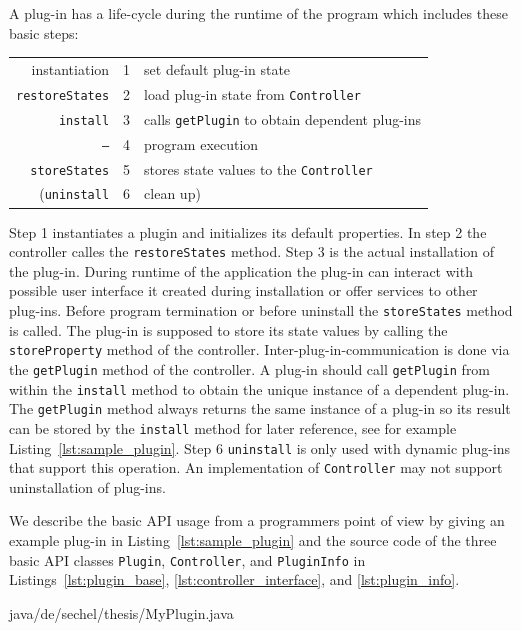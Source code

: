 \documentclass[Thesis.tex]{subfiles}
\begin{document}
A plug-in has a life-cycle during the runtime of the program which includes these basic
steps:
\begin{center}
\begin{tabular}{r|r|l}
	instantiation & 1 & set default plug-in state\\
	{\tt restoreStates} & 2 & load plug-in state from {\tt Controller}\\
	{\tt install} & 3 & calls {\tt getPlugin} to obtain dependent plug-ins\\
	{\tt --}  & 4 & program execution\\
	{\tt storeStates} & 5 & stores state values to the {\tt Controller}\\
	({\tt uninstall} & 6 & clean up)
\end{tabular}
\end{center}
Step 1 instantiates a plugin and initializes its default properties. In step 2 the controller 
calles the {\tt restoreStates} method. Step 3 is the actual installation of the plug-in. 
During runtime
of the application the plug-in can interact with possible user interface it created during 
installation or offer services to other plug-ins. 
Before program termination or before uninstall the {\tt storeStates} method is called. The plug-in
is supposed to store its state values by calling the {\tt storeProperty}
method of the controller.
Inter-plug-in-communication is done via the {\tt getPlugin} method of the controller. 
A plug-in should call {\tt getPlugin} from within the {\tt install} method to obtain the unique instance 
of a dependent plug-in. The {\tt getPlugin} method always returns the same instance of a plug-in so its
result can be stored by the {\tt install} method for later reference, see for example 
Listing~\ref{lst:sample_plugin}. Step 6 {\tt uninstall} is only used with dynamic plug-ins that support 
this operation. An implementation of {\tt Controller} may not support uninstallation of plug-ins.

We describe the basic API usage from a programmers point of view by giving an example plug-in
in Listing~\ref{lst:sample_plugin} and the source code of the three basic API classes 
{\tt Plugin}, {\tt Controller}, and {\tt PluginInfo} in Listings~\ref{lst:plugin_base}, 
\ref{lst:controller_interface}, and \ref{lst:plugin_info}.

 {java/de/sechel/thesis/MyPlugin.java}
\end{document}
